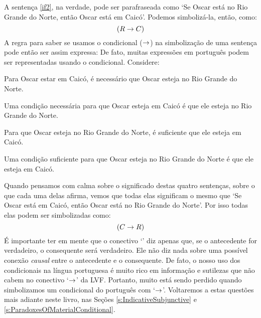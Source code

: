 A sentença \ref{if2}, na verdade, pode ser parafraseada como `Se Oscar está no Rio Grande do Norte, então Oscar está em Caicó'.
Podemos simbolizá-la, então, como:
$$(R \rightarrow C)$$
A regra para saber se usamos o condicional ($\rightarrow$) na simbolização de uma sentença pode então ser assim expressa:
\noindent De fato, muitas expressões em português podem ser representadas usando o condicional. Considere:
	\begin{earg}
		\item[\ex{ifnec1}] Para Oscar estar em Caicó, é necessário que Oscar esteja no Rio Grande do Norte.
		\item[\ex{ifnec2}] Uma condição necessária para que Oscar esteja em Caicó é que ele esteja no Rio Grande do Norte.
		\item[\ex{ifsuf1}] Para que Oscar esteja no Rio Grande do Norte, é suficiente que ele esteja em Caicó.
		\item[\ex{ifsuf2}] Uma condição suficiente para que Oscar esteja no Rio Grande do Norte é que ele esteja em Caicó.
	\end{earg}
Quando pensamos com calma sobre o significado destas quatro sentenças, sobre o que cada uma delas afirma, vemos que todas elas significam o mesmo que `Se Oscar está em Caicó, então Oscar está no Rio Grande do Norte'.
Por isso todas elas podem ser simbolizadas como:
$$(C \rightarrow R)$$
É importante ter em mente que o conectivo `\eif' diz apenas que, se o antecedente for verdadeiro, o consequente será verdadeiro.
Ele não diz nada sobre uma possível conexão \emph{causal} entre o antecedente e o consequente.
De fato, o nosso uso dos condicionais na língua portuguesa é muito rico em informação e sutilezas que não cabem no conectivo `$\rightarrow$' da LVF.
Portanto, muito está sendo perdido quando simbolizamos um condicional do português com `$\rightarrow$'.
Voltaremos a estas questões mais adiante neste livro, nas Seções \ref{s:IndicativeSubjunctive} e \ref{s:ParadoxesOfMaterialConditional}.


